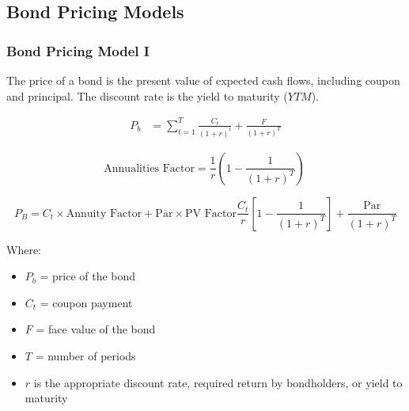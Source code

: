 \documentclass[
]{book}
\providecommand{\tightlist}{%
  \setlength{\itemsep}{0pt}\setlength{\parskip}{0pt}}
\begin{document}
\hypertarget{bond-pricing-models}{%
\subsection{Bond Pricing Models}\label{bond-pricing-models}}

\hypertarget{bond-pricing-model-i}{%
\subsubsection{Bond Pricing Model I}\label{bond-pricing-model-i}}

The price of a bond is the present value of expected cash flows, including coupon and principal. The discount rate is the yield to maturity (\(YTM\)).

\[
\begin{align}
P_b &= \sum_{t=1}^{T} \frac{C_t}{(1 + r)^t} + \frac{F}{(1 + r)^T}
\end{align}
\]

\[
\text{Annualities Factor} = \frac{1}{r} \left( 1 - \frac{1}{(1 + r)^T} \right)\
\]

\[
P_B = C_t \times \text{Annuity Factor} + \text{Par} \times \text{PV Factor}\frac{C_t}{r} \left[ 1 - \frac{1}{(1 + r)^T} \right] + \frac{\text{Par}}{(1 + r)^T}
\]

Where:

\begin{itemize}
\tightlist
\item
  \(P_b\) = price of the bond
\item
  \(C_t\) = coupon payment
\item
  \(F\) = face value of the bond
\item
  \(T\) = number of periods
\item
  \(r\) is the appropriate discount rate, required return by bondholders, or yield to maturity
\end{itemize}
\end{document}
